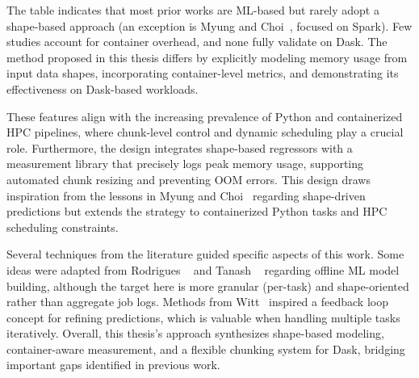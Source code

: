 The table indicates that most prior works are \ac{ML}-based but rarely adopt a shape-based approach (an exception is Myung and Choi~\cite{myung2021}, focused on Spark).
Few studies account for container overhead, and none fully validate on Dask.
The method proposed in this thesis differs by explicitly modeling memory usage from input data shapes, incorporating container-level metrics, and demonstrating its effectiveness on Dask-based workloads.

These features align with the increasing prevalence of Python and containerized \ac{HPC} pipelines, where chunk-level control and dynamic scheduling play a crucial role.
Furthermore, the design integrates shape-based regressors with a measurement library that precisely logs peak memory usage, supporting automated chunk resizing and preventing \ac{OOM} errors.
This design draws inspiration from the lessons in Myung and Choi~\cite{myung2021} regarding shape-driven predictions but extends the strategy to containerized Python tasks and HPC scheduling constraints.

Several techniques from the literature guided specific aspects of this work.
Some ideas were adapted from Rodrigues \etal~\cite{rodrigues2016} and Tanash \etal~\cite{tanash2021ampro} regarding offline \ac{ML} model building, although the target here is more granular (per-task) and shape-oriented rather than aggregate job logs.
Methods from Witt~\cite{witt2020} inspired a feedback loop concept for refining predictions, which is valuable when handling multiple tasks iteratively.
Overall, this thesis's approach synthesizes shape-based modeling, container-aware measurement, and a flexible chunking system for Dask, bridging important gaps identified in previous work.